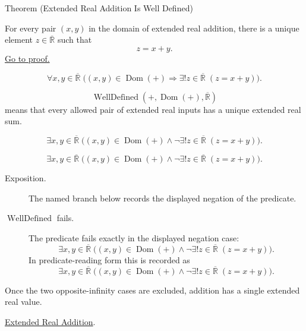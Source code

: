 \begin{theorembox}{Theorem (Extended Real Addition Is Well Defined)}
\begin{theorem}
\label{thm:extended-real-addition-well-defined}
For every pair $(x,y)$ in the domain of extended real addition, there is a
unique element $z\in\overline{\mathbb{R}}$ such that
\[
z=x+y.
\]
\hyperref[prf:extended-real-addition-well-defined]{Go to proof.}
\end{theorem}
\end{theorembox}
\begin{remark*}
\[
\forall x,y\in\overline{\mathbb{R}}\;
\bigl((x,y)\in\operatorname{Dom}(+)\Rightarrow
\exists!z\in\overline{\mathbb{R}}\;(z=x+y)\bigr).
\]
\end{remark*}
\begin{remark*}
\[
\operatorname{WellDefined}(+,\operatorname{Dom}(+),\overline{\mathbb{R}})
\]
means that every allowed pair of extended real inputs has a unique extended real sum.
\end{remark*}
\begin{remark*}
\[
\exists x,y\in\overline{\mathbb{R}}\;
\bigl((x,y)\in\operatorname{Dom}(+)\land
\neg\exists!z\in\overline{\mathbb{R}}\;(z=x+y)\bigr).
\]
\end{remark*}

\begin{remark*}
\[
\exists x,y\in\overline{\mathbb{R}}\;
\bigl((x,y)\in\operatorname{Dom}(+)\land
\neg\exists!z\in\overline{\mathbb{R}}\;(z=x+y)\bigr).
\]
\end{remark*}

\begin{remark*}
\begin{description}
  \item[Exposition.] The named branch below records the displayed negation of the predicate.
  \item[\(\operatorname{WellDefined}\) fails.] The predicate fails exactly in the displayed negation case:
  \[
  \exists x,y\in\overline{\mathbb{R}}\;
  \bigl((x,y)\in\operatorname{Dom}(+)\land
  \neg\exists!z\in\overline{\mathbb{R}}\;(z=x+y)\bigr).
  \]
  In predicate-reading form this is recorded as
  \[
  \exists x,y\in\overline{\mathbb{R}}\;
  \bigl((x,y)\in\operatorname{Dom}(+)\land
  \neg\exists!z\in\overline{\mathbb{R}}\;(z=x+y)\bigr).
  \]
\end{description}
\end{remark*}
\begin{remark*}[Interpretation]
Once the two opposite-infinity cases are excluded, addition has a single
extended real value.
\end{remark*}
\begin{dependencies}
\hyperref[def:extended-real-addition]{Extended Real Addition}.
\end{dependencies}

